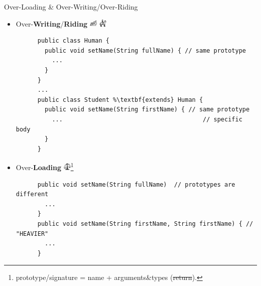 \documentclass[English,t,%
hyperref={%
    pdftitle={FISA-DE2 OOP in Java},%
    pdfauthor={Guillaume Muller},%
    pdfsubject={OOP in Java},%
    pdfkeywords={OOP,Java}%
    },%
xcolor={pdftex,svgnames} %
]{beamer}
\begin{document}
\begin{frame}[fragile]{Over-Loading \& Over-Writing/Over-Riding}

  \begin{itemize}
%
    \item Over-\textbf{Writing}/\textbf{Riding} \hspace{2em} \includegraphics[width=1em]{images02/writing.png} \hspace{2em} \includegraphics[width=1em]{images02/riding1.png}
    \begin{lstlisting}
      public class Human {
        public void setName(String fullName) { // same prototype
          ...
        }
      }
      ...
      public class Student %\textbf{extends} Human {
        public void setName(String firstName) { // same prototype
          ...                                       // specific body
        }
      }
    \end{lstlisting}
%
    \vspace{2em}
    \item Over-\textbf{Loading} \hspace{2em} \includegraphics[width=1em]{images02/overweighted_scale.png}\footnote{prototype/signature = name + arguments\&types (\sout{return}).}
    \begin{lstlisting}
      public void setName(String fullName)  // prototypes are different
        ...
      }
      public void setName(String firstName, String firstName) { // "HEAVIER"
        ...
      }
    \end{lstlisting}
%
  \end{itemize}

\end{frame}
\end{document}
